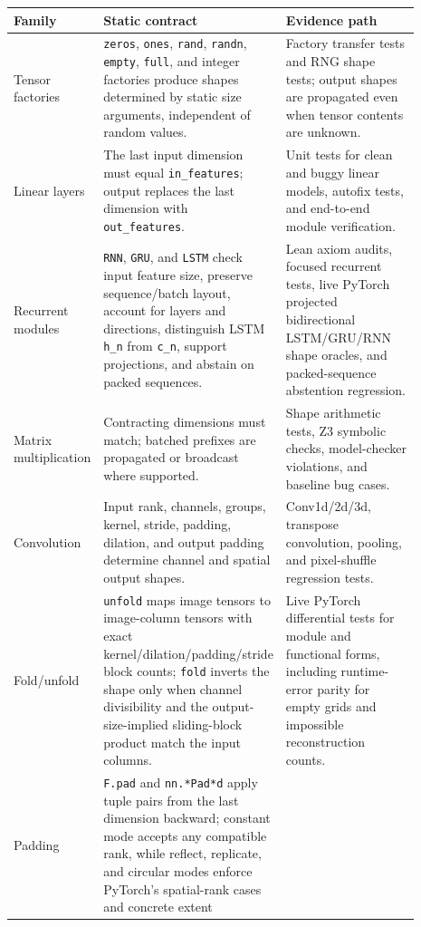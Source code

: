 \documentclass[11pt]{article}
\begin{document}
\begin{longtable}{|p{0.22\linewidth}|p{0.31\linewidth}|p{0.36\linewidth}|}
\hline
\textbf{Family} & \textbf{Static contract} & \textbf{Evidence path} \\
\hline
Tensor factories &
\texttt{zeros}, \texttt{ones}, \texttt{rand}, \texttt{randn}, \texttt{empty},
\texttt{full}, and integer factories produce shapes determined by static size
arguments, independent of random values. &
Factory transfer tests and RNG shape tests; output shapes are propagated even
when tensor contents are unknown. \\
\hline
Linear layers &
The last input dimension must equal \texttt{in\_features}; output replaces the
last dimension with \texttt{out\_features}. &
Unit tests for clean and buggy linear models, autofix tests, and end-to-end
module verification. \\
\hline
Recurrent modules &
\texttt{RNN}, \texttt{GRU}, and \texttt{LSTM} check input feature size, preserve
sequence/batch layout, account for layers and directions, distinguish LSTM
\texttt{h\_n} from \texttt{c\_n}, support projections, and abstain on packed
sequences. &
Lean axiom audits, focused recurrent tests, live PyTorch projected bidirectional
LSTM/GRU/RNN shape oracles, and packed-sequence abstention regression. \\
\hline
Matrix multiplication &
Contracting dimensions must match; batched prefixes are propagated or
broadcast where supported. &
Shape arithmetic tests, Z3 symbolic checks, model-checker violations, and
baseline bug cases. \\
\hline
Convolution &
Input rank, channels, groups, kernel, stride, padding, dilation, and output
padding determine channel and spatial output shapes. &
Conv1d/2d/3d, transpose convolution, pooling, and pixel-shuffle regression
tests. \\
\hline
Fold/unfold &
\texttt{unfold} maps image tensors to image-column tensors with exact
kernel/dilation/padding/stride block counts; \texttt{fold} inverts the shape only
when channel divisibility and the output-size-implied sliding-block product
match the input columns. &
Live PyTorch differential tests for module and functional forms, including
runtime-error parity for empty grids and impossible reconstruction counts. \\
\hline
Padding &
\texttt{F.pad} and \texttt{nn.*Pad*d} apply tuple pairs from the last dimension
backward; constant mode accepts any compatible rank, while reflect, replicate,
and circular modes enforce PyTorch's spatial-rank cases and concrete extent

\end{longtable}
\end{document}
